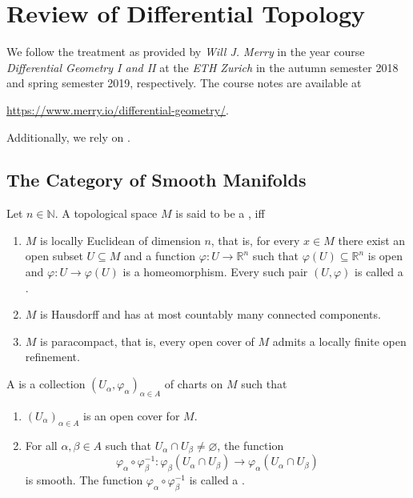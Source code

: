 \chapter{Review of Differential Topology}
We follow the treatment as provided by \emph{Will J. Merry} in the year course \emph{Differential Geometry I and II} at the \emph{ETH Zurich} in the autumn semester 2018 and spring semester 2019, respectively. The course notes are available at
\begin{center}
	\href{https://www.merry.io/differential-geometry/}{https://www.merry.io/differential-geometry/}.
\end{center}
Additionally, we rely on \cite{lee:smooth_manifolds:2013}.

\section*{The Category of Smooth Manifolds}

\begin{definition}
	Let $n \in \mathbb{N}$. A topological space $M$ is said to be a , iff
	\begin{enumerate}[label = \textup{(\roman*)},leftmargin=*]
		\item $M$ is locally Euclidean of dimension $n$, that is, for every $x \in M$ there exist an open subset $U \subseteq M$ and a function $\varphi : U \to \mathbb{R}^n$ such that $\varphi(U) \subseteq \mathbb{R}^n$ is open and $\varphi : U \to \varphi(U)$ is a homeomorphism. Every such pair $(U,\varphi)$ is called a .
		\item $M$ is Hausdorff and has at most countably many connected components.
		\item $M$ is paracompact, that is, every open cover of $M$ admits a locally finite open refinement.
	\end{enumerate}
\end{definition}

\begin{definition}
	A  is a collection $(U_\alpha,\varphi_\alpha)_{\alpha \in A}$ of charts on $M$ such that
	\begin{enumerate}[label = \textup{(\roman*)},leftmargin = *]
		\item $(U_\alpha)_{\alpha \in A}$ is an open cover for $M$.
		\item For all $\alpha,\beta \in A$ such that $U_\alpha \cap U_\beta \neq \varnothing$, the function 
			\begin{equation*}
				\varphi_\alpha \circ \varphi_\beta^{-1} : \varphi_\beta(U_\alpha \cap U_\beta) \to \varphi_\alpha(U_\alpha \cap U_\beta)
			\end{equation*}
			\noindent is smooth. The function $\varphi_\alpha \circ \varphi_\beta^{-1}$ is called a .
	\end{enumerate}
\end{definition}

